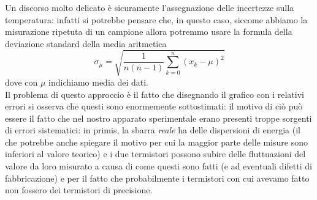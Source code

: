 \documentclass{article}
\begin{document}
\noindent Un discorso molto delicato è sicuramente l'assegnazione delle incertezze sulla temperatura: infatti si potrebbe pensare che, in questo caso, siccome abbiamo la misurazione ripetuta di un campione allora potremmo usare la formula della deviazione standard della media aritmetica
\begin{equation}
	\sigma_\mu = \sqrt{\frac{1}{n(n-1)} \sum_{k = 0}^{n} (x_k - \mu)^2}
\end{equation}
dove con $\mu$ indichiamo media dei dati. \\
Il problema di questo approccio è il fatto che disegnando il grafico con i relativi errori si osserva che questi sono enormemente sottostimati: il motivo di ciò può essere il fatto che nel nostro apparato sperimentale erano presenti troppe sorgenti di errori sistematici: in primis, la sbarra \emph{reale} ha delle dispersioni di energia (il che potrebbe anche spiegare il motivo per cui la maggior parte delle misure sono inferiori al valore teorico) e i due termistori possono subire delle fluttuazioni del valore da loro misurato a causa di come questi sono fatti (e ad eventuali difetti di fabbricazione) e per il fatto che probabilmente i termistori con cui avevamo fatto non fossero dei termistori di precisione.
\end{document}
